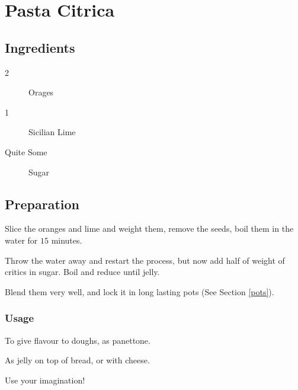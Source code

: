 \setchapterpreamble[u]{\margintoc}
\chapter{Pasta Citrica}\label{pancake}

\section{Ingredients}

\begin{multicols}{2}
	\begin{description}
		\item[2] Orages
		\item[1] Sicilian Lime
		\item[Quite Some] Sugar
	\end{description}
\end{multicols}	

\section{Preparation}
Slice the oranges and lime and weight them, remove the seeds, boil them in the water for $15$ minutes. 

Throw the water away and restart the process, but now add half of weight of critics in sugar. Boil and reduce until jelly.

Blend them very well, and lock it in long lasting pots (See Section \ref{pots}). 

\subsection{Usage}

To give flavour to doughs, as panettone.

As jelly on top of bread, or with cheese.

Use your imagination!